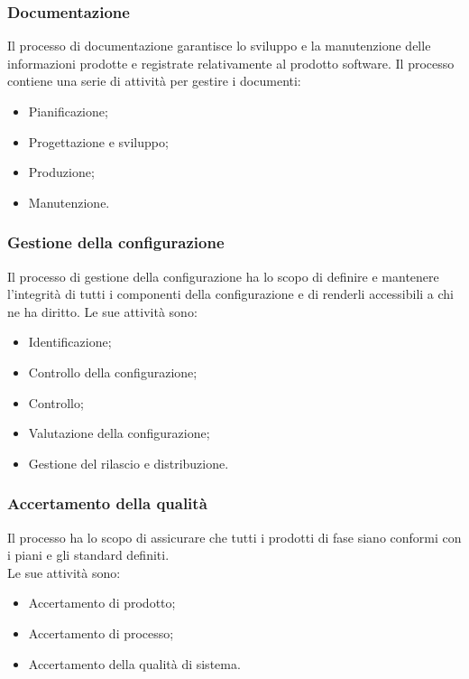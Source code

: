 \subsubsection{Documentazione}
Il processo di documentazione garantisce lo sviluppo e la manutenzione delle informazioni prodotte e registrate relativamente al prodotto software. Il processo contiene una serie di attività per gestire i documenti:
\begin{itemize}

	\item Pianificazione;

	\item Progettazione e sviluppo;
	
	\item Produzione;
	
	\item Manutenzione.

\end{itemize}

\subsubsection{Gestione della configurazione}
Il processo di gestione della configurazione ha lo scopo di definire e mantenere l'integrità di tutti i componenti della configurazione e di renderli accessibili a chi ne ha diritto. Le sue attività sono:
\begin{itemize}

	\item Identificazione;
	
	\item Controllo della configurazione;
	
	\item Controllo; 	
	
	\item Valutazione della configurazione;
	
	\item Gestione del rilascio e distribuzione.

\end{itemize}

\subsubsection{Accertamento della qualità}
Il processo ha lo scopo di assicurare che tutti i prodotti di fase siano conformi con i piani e gli standard definiti. \\
Le sue attività sono:
\begin{itemize}

	\item Accertamento di prodotto;
	
	\item Accertamento di processo;
	
	\item Accertamento della qualità di sistema.

\end{itemize}

